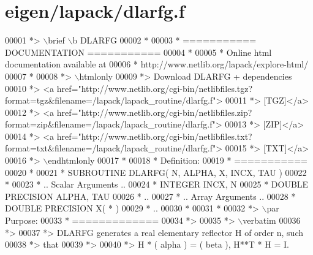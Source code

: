 \hypertarget{eigen_2lapack_2dlarfg_8f_source}{}\section{eigen/lapack/dlarfg.f}
\label{eigen_2lapack_2dlarfg_8f_source}

\begin{DoxyCode}
00001 \textcolor{comment}{*> \(\backslash\)brief \(\backslash\)b DLARFG}
00002 \textcolor{comment}{*}
00003 \textcolor{comment}{*  =========== DOCUMENTATION ===========}
00004 \textcolor{comment}{*}
00005 \textcolor{comment}{* Online html documentation available at }
00006 \textcolor{comment}{*            http://www.netlib.org/lapack/explore-html/ }
00007 \textcolor{comment}{*}
00008 \textcolor{comment}{*> \(\backslash\)htmlonly}
00009 \textcolor{comment}{*> Download DLARFG + dependencies }
00010 \textcolor{comment}{*> <a
       href="http://www.netlib.org/cgi-bin/netlibfiles.tgz?format=tgz&filename=/lapack/lapack\_routine/dlarfg.f"> }
00011 \textcolor{comment}{*> [TGZ]</a> }
00012 \textcolor{comment}{*> <a
       href="http://www.netlib.org/cgi-bin/netlibfiles.zip?format=zip&filename=/lapack/lapack\_routine/dlarfg.f"> }
00013 \textcolor{comment}{*> [ZIP]</a> }
00014 \textcolor{comment}{*> <a
       href="http://www.netlib.org/cgi-bin/netlibfiles.txt?format=txt&filename=/lapack/lapack\_routine/dlarfg.f"> }
00015 \textcolor{comment}{*> [TXT]</a>}
00016 \textcolor{comment}{*> \(\backslash\)endhtmlonly }
00017 \textcolor{comment}{*}
00018 \textcolor{comment}{*  Definition:}
00019 \textcolor{comment}{*  ===========}
00020 \textcolor{comment}{*}
00021 \textcolor{comment}{*       SUBROUTINE DLARFG( N, ALPHA, X, INCX, TAU )}
00022 \textcolor{comment}{* }
00023 \textcolor{comment}{*       .. Scalar Arguments ..}
00024 \textcolor{comment}{*       INTEGER            INCX, N}
00025 \textcolor{comment}{*       DOUBLE PRECISION   ALPHA, TAU}
00026 \textcolor{comment}{*       ..}
00027 \textcolor{comment}{*       .. Array Arguments ..}
00028 \textcolor{comment}{*       DOUBLE PRECISION   X( * )}
00029 \textcolor{comment}{*       ..}
00030 \textcolor{comment}{*  }
00031 \textcolor{comment}{*}
00032 \textcolor{comment}{*> \(\backslash\)par Purpose:}
00033 \textcolor{comment}{*  =============}
00034 \textcolor{comment}{*>}
00035 \textcolor{comment}{*> \(\backslash\)verbatim}
00036 \textcolor{comment}{*>}
00037 \textcolor{comment}{*> DLARFG generates a real elementary reflector H of order n, such}
00038 \textcolor{comment}{*> that}
00039 \textcolor{comment}{*>}
00040 \textcolor{comment}{*>       H * ( alpha ) = ( beta ),   H**T * H = I.}

\end{DoxyCode}
